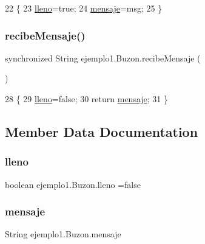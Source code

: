 \begin{DoxyCode}
22     \{
23         \mbox{\hyperlink{classejemplo1_1_1_buzon_ac583b5512506d514f8443245c5edb3f9}{lleno}}=\textcolor{keyword}{true};
24         \mbox{\hyperlink{classejemplo1_1_1_buzon_a905e959ffa27d5f6abc134be86dbb6d3}{mensaje}}=msg;
25     \}
\end{DoxyCode}
\mbox{\label{classejemplo1_1_1_buzon_a198396f4151d8359e98a2aa7e66729af}} 
\subsubsection{\texorpdfstring{recibe\+Mensaje()}{recibeMensaje()}}
{\footnotesize\ttfamily synchronized String ejemplo1.\+Buzon.\+recibe\+Mensaje (\begin{DoxyParamCaption}{ }\end{DoxyParamCaption})\hspace{0.3cm}{\ttfamily [inline]}}


\begin{DoxyCode}
28     \{
29         \mbox{\hyperlink{classejemplo1_1_1_buzon_ac583b5512506d514f8443245c5edb3f9}{lleno}}=\textcolor{keyword}{false};
30         \textcolor{keywordflow}{return} \mbox{\hyperlink{classejemplo1_1_1_buzon_a905e959ffa27d5f6abc134be86dbb6d3}{mensaje}};
31     \}
\end{DoxyCode}


\subsection{Member Data Documentation}
\mbox{\label{classejemplo1_1_1_buzon_ac583b5512506d514f8443245c5edb3f9}} 
\subsubsection{\texorpdfstring{lleno}{lleno}}
{\footnotesize\ttfamily boolean ejemplo1.\+Buzon.\+lleno =false\hspace{0.3cm}{\ttfamily [private]}}

\mbox{\label{classejemplo1_1_1_buzon_a905e959ffa27d5f6abc134be86dbb6d3}} 
\subsubsection{\texorpdfstring{mensaje}{mensaje}}
{\footnotesize\ttfamily String ejemplo1.\+Buzon.\+mensaje\hspace{0.3cm}{\ttfamily [private]}}

